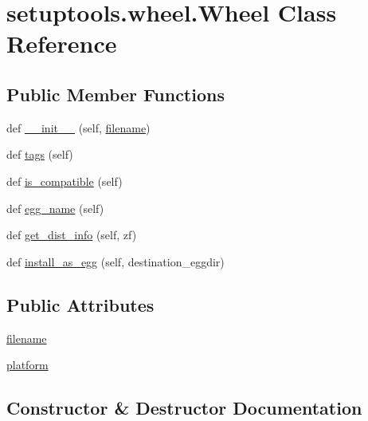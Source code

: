 \hypertarget{classsetuptools_1_1wheel_1_1Wheel}{}\section{setuptools.\+wheel.\+Wheel Class Reference}
\label{classsetuptools_1_1wheel_1_1Wheel}
\subsection*{Public Member Functions}
\begin{DoxyCompactItemize}
\item 
def \hyperlink{classsetuptools_1_1wheel_1_1Wheel_a65645a6b169144f5aca1c47e227dc7b8}{\+\_\+\+\_\+init\+\_\+\+\_\+} (self, \hyperlink{classsetuptools_1_1wheel_1_1Wheel_a922b9e7e017e547a8588c48265ee2dc3}{filename})
\item 
def \hyperlink{classsetuptools_1_1wheel_1_1Wheel_a2d24e91430aebfbbafa099eaeb00a5f4}{tags} (self)
\item 
def \hyperlink{classsetuptools_1_1wheel_1_1Wheel_aa3b52caa6023c95670ac3bdb3d730c2c}{is\+\_\+compatible} (self)
\item 
def \hyperlink{classsetuptools_1_1wheel_1_1Wheel_a8003a0c439abab30a420897c391dfbe1}{egg\+\_\+name} (self)
\item 
def \hyperlink{classsetuptools_1_1wheel_1_1Wheel_a4ea80347423ac720558aecd7c69dac76}{get\+\_\+dist\+\_\+info} (self, zf)
\item 
def \hyperlink{classsetuptools_1_1wheel_1_1Wheel_a4d5d8dcde757279d6509a1f9137e595d}{install\+\_\+as\+\_\+egg} (self, destination\+\_\+eggdir)
\end{DoxyCompactItemize}
\subsection*{Public Attributes}
\begin{DoxyCompactItemize}
\item 
\hyperlink{classsetuptools_1_1wheel_1_1Wheel_a922b9e7e017e547a8588c48265ee2dc3}{filename}
\item 
\hyperlink{classsetuptools_1_1wheel_1_1Wheel_ab0c549e3d958bd72b70c3b984fe5b1fe}{platform}
\end{DoxyCompactItemize}


\subsection{Constructor \& Destructor Documentation}
\mbox{\label{classsetuptools_1_1wheel_1_1Wheel_a65645a6b169144f5aca1c47e227dc7b8}} 
